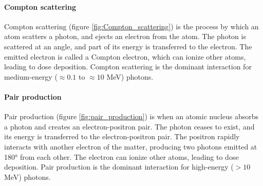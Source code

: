 \paragraph{Compton scattering}
Compton scattering (figure \ref{fig:Compton_scattering}) is the process by which an atom scatters a photon, and ejects an electron from the atom.
The photon is scattered at an angle, and part of its energy is transferred to the electron.
The emitted electron is called a Compton electron, which can ionize other atoms, leading to dose deposition.
Compton scattering is the dominant interaction for medium-energy ($\approx 0.1$ to $\approx 10$ MeV) photons.

\paragraph{Pair production}
Pair production (figure \ref{fig:pair_production}) is when an atomic nucleus absorbs a photon and creates an electron-positron pair.
The photon ceases to exist, and its energy is transferred to the electron-positron pair.
The positron rapidly interacts with another electron of the matter, producing two photons emitted at 180° from each other.
The electron can ionize other atoms, leading to dose deposition.
Pair production is the dominant interaction for high-energy ($ > 10$ MeV) photons.

